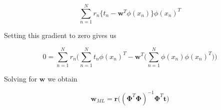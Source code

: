\documentclass[a4paper]{article}
\begin{document}
\begin{equation}
\sum_{n=1}^{N} r_n \big\{ t_n - \textbf{w}^T \phi(x_n) \big\} \phi(x_n)^T
\end{equation}

Setting this gradient to zero gives us

\begin{equation}
0 = \sum_{n=1}^{N} r_n \Bigg( \sum_{n=1}^{N} t_n \phi(x_n)^T - \textbf{w}^T \bigg( \sum_{n=1}^{N} \phi(x_n) \phi(x_n)^T  \bigg)  \Bigg)
\end{equation}

Solving for $\textbf{w}$ we obtain

\begin{equation}
\textbf{w}_{ML} = \mathbf{r}\big(( \mathbf{\Phi}^T \mathbf{\Phi} )^{-1} \mathbf{\Phi}^T\mathbf{t}\big)
\end{equation}
\end{document}
